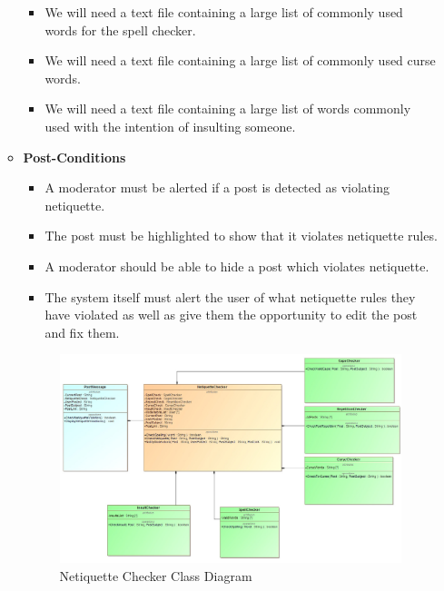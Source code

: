 \documentclass[11pt]{article}
\begin{document}
\begin{enumerate}
\begin{itemize}
\begin{itemize}
\begin{itemize}
	  		\end{itemize}
	  		\item We will need a text file containing a large list of commonly used words for the spell checker.
	  		\item We will need a text file containing a large list of commonly used curse words.
			\item We will need a text file containing a large list of words commonly used with the intention of insulting someone.
  		\end{itemize}
  	\item	\textbf{Post-Conditions}
  		\begin{itemize}
	  		\item A moderator must be alerted if a post is detected as violating netiquette.
	  		\item The post must be highlighted to show that it violates netiquette rules.
	  		\item A moderator should be able to hide a post which violates netiquette.
	  		\item The system itself must alert the user of what netiquette rules they have violated as well as give them the opportunity to edit the post and fix them.
	  	\end{itemize}
	  		\begin{figure}[H]
	  			\includegraphics[scale=0.35,center]{NetInputOutput.jpg}
	  			\caption{Netiquette Checker Class Diagram}
	  		\end{figure}
	  		\begin{figure}[H]

\end{figure}
\end{itemize}
\end{enumerate}
\end{document}
